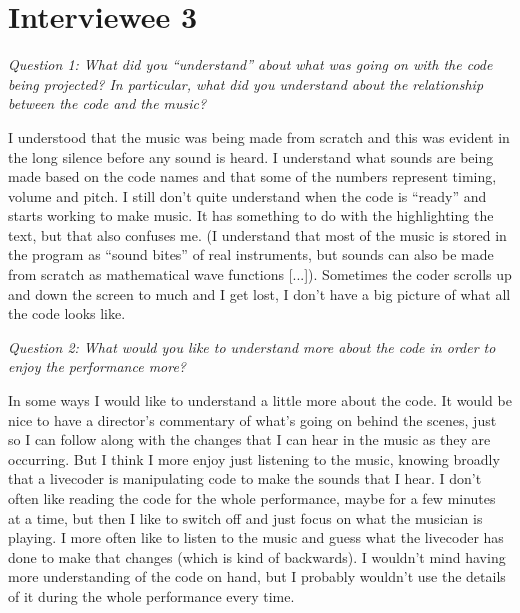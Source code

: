 \section*{Interviewee 3}

\textit{Question 1: What did you ``understand'' about what was going on with the code being projected? In particular, what did you understand about the relationship between the code and the music?}

I understood that the music was being made from scratch and this was evident in the long silence before any sound is heard. I understand what sounds are being made based on the code names and that some of the numbers represent timing, volume and pitch.  I still don't quite understand when the code is ``ready'' and starts working to make music. It has something to do with the highlighting the text, but that also confuses me. (I understand that most of the music is stored in the program as ``sound bites'' of real instruments, but sounds can also be made from scratch as mathematical wave functions [...]). Sometimes the coder scrolls up and down the screen to much and I get lost, I don't have a big picture of what all the code looks like.

\textit{Question 2: What would you like to understand more about the code in order to enjoy the performance more?}

In some ways I would like to understand a little more about the code. It would be nice to have a director's commentary of what's going on behind the scenes, just so I can follow along with the changes that I can hear in the music as they are occurring. But I think I more enjoy just listening to the music, knowing broadly that a livecoder is manipulating code to make the sounds that I hear. I don't often like reading the code for the whole performance, maybe for a few minutes at a time, but then I like to switch off and just focus on what the musician is playing. I more often like to listen to the music and guess what the livecoder has done to make that changes (which is kind of backwards). I wouldn't mind having more understanding of the code on hand, but I probably wouldn't use the details of it during the whole performance every time.
